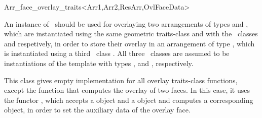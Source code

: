 
\ccRefPageBegin

\begin{ccRefClass}{Arr_face_overlay_traits<Arr1,Arr2,ResArr,OvlFaceData>}

\ccDefinition

An instance of \ccRefName\ should be used for overlaying two arrangements
of types  and , which are instantiated using the same
geometric traits-class and with the \dcel\ classes  and 
respetively, in order to store their overlay in an arrangement of type
, which is instantiated using a third \dcel\ class .
All three \dcel\ classes are assumed to be instantiations of the
 template with types ,
 and , respectively.

This class gives empty implementation for all overlay traits-class functions,
except the function that computes the overlay of two faces. In this case,
it uses the functor , which accepts a  object
and a  object and computes a corresponding 
object, in order to set the auxiliary data of the overlay face.


\ccIsModel

\ccSeeAlso
     \\
     \\

\end{ccRefClass}

\ccRefPageEnd
